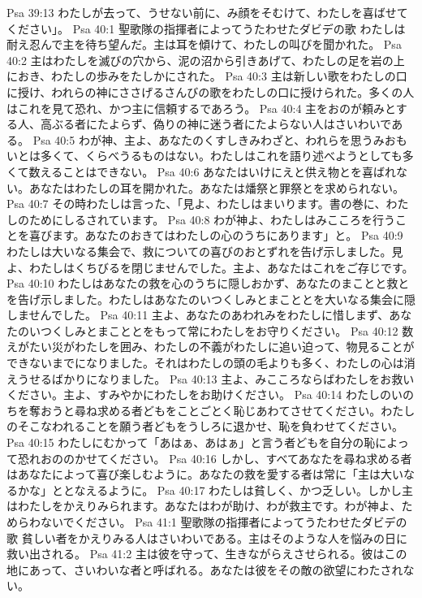 Psa 39:13  わたしが去って、うせない前に、み顔をそむけて、わたしを喜ばせてください」。
Psa 40:1  聖歌隊の指揮者によってうたわせたダビデの歌 わたしは耐え忍んで主を待ち望んだ。主は耳を傾けて、わたしの叫びを聞かれた。
Psa 40:2  主はわたしを滅びの穴から、泥の沼から引きあげて、わたしの足を岩の上におき、わたしの歩みをたしかにされた。
Psa 40:3  主は新しい歌をわたしの口に授け、われらの神にささげるさんびの歌をわたしの口に授けられた。多くの人はこれを見て恐れ、かつ主に信頼するであろう。
Psa 40:4  主をおのが頼みとする人、高ぶる者にたよらず、偽りの神に迷う者にたよらない人はさいわいである。
Psa 40:5  わが神、主よ、あなたのくすしきみわざと、われらを思うみおもいとは多くて、くらべうるものはない。わたしはこれを語り述べようとしても多くて数えることはできない。
Psa 40:6  あなたはいけにえと供え物とを喜ばれない。あなたはわたしの耳を開かれた。あなたは燔祭と罪祭とを求められない。
Psa 40:7  その時わたしは言った、「見よ、わたしはまいります。書の巻に、わたしのためにしるされています。
Psa 40:8  わが神よ、わたしはみこころを行うことを喜びます。あなたのおきてはわたしの心のうちにあります」と。
Psa 40:9  わたしは大いなる集会で、救についての喜びのおとずれを告げ示しました。見よ、わたしはくちびるを閉じませんでした。主よ、あなたはこれをご存じです。
Psa 40:10  わたしはあなたの救を心のうちに隠しおかず、あなたのまことと救とを告げ示しました。わたしはあなたのいつくしみとまこととを大いなる集会に隠しませんでした。
Psa 40:11  主よ、あなたのあわれみをわたしに惜しまず、あなたのいつくしみとまこととをもって常にわたしをお守りください。
Psa 40:12  数えがたい災がわたしを囲み、わたしの不義がわたしに追い迫って、物見ることができないまでになりました。それはわたしの頭の毛よりも多く、わたしの心は消えうせるばかりになりました。
Psa 40:13  主よ、みこころならばわたしをお救いください。主よ、すみやかにわたしをお助けください。
Psa 40:14  わたしのいのちを奪おうと尋ね求める者どもをことごとく恥じあわてさせてください。わたしのそこなわれることを願う者どもをうしろに退かせ、恥を負わせてください。
Psa 40:15  わたしにむかって「あはぁ、あはぁ」と言う者どもを自分の恥によって恐れおののかせてください。
Psa 40:16  しかし、すべてあなたを尋ね求める者はあなたによって喜び楽しむように。あなたの救を愛する者は常に「主は大いなるかな」ととなえるように。
Psa 40:17  わたしは貧しく、かつ乏しい。しかし主はわたしをかえりみられます。あなたはわが助け、わが救主です。わが神よ、ためらわないでください。
Psa 41:1  聖歌隊の指揮者によってうたわせたダビデの歌 貧しい者をかえりみる人はさいわいである。主はそのような人を悩みの日に救い出される。
Psa 41:2  主は彼を守って、生きながらえさせられる。彼はこの地にあって、さいわいな者と呼ばれる。あなたは彼をその敵の欲望にわたされない。
